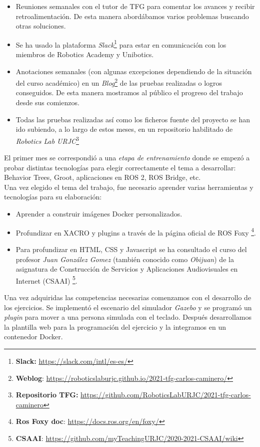 \begin{itemize}
	\item Reuniones semanales con el tutor de TFG para comentar los avances y recibir retroalimentación. De esta manera abordábamos varios problemas buscando otras soluciones.
	\item Se ha usado la plataforma \textit{Slack}\footnote{\textbf{Slack:} \url{https://slack.com/intl/es-es/}} para estar en comunicación con los miembros de Robotics Academy y Unibotics.
	\item Anotaciones semanales (con algunas excepciones dependiendo de la situación del curso académico) en un \textit{Blog}\footnote{\textbf{Weblog}: \url{https://roboticslaburjc.github.io/2021-tfg-carlos-caminero/}} de las pruebas realizadas o logros conseguidos. De esta manera mostramos al público el progreso del trabajo desde sus comienzos.
	\item Todas las pruebas realizadas así como los ficheros fuente del proyecto se han ido subiendo, a lo largo de estos meses, en un repositorio habilitado de \textit{Robotics Lab URJC}\footnote{\textbf{Repositorio TFG:} \url{https://github.com/RoboticsLabURJC/2021-tfg-carlos-caminero}}
\end{itemize}

El primer mes se correspondió a una \textit{etapa de entrenamiento} donde se empezó a probar distintas tecnologías para elegir correctamente el tema a desarrollar: Behavior Trees, Groot, aplicaciones en ROS 2, ROS Bridge, etc.\\

Una vez elegido el tema del trabajo, fue necesario aprender varias herramientas y tecnologías para su elaboración:
\begin{itemize}
	\item Aprender a construir imágenes Docker personalizados.
	\item Profundizar en XACRO y plugins a través de la página oficial de ROS Foxy \footnote{\textbf{Ros Foxy doc}: \url{https://docs.ros.org/en/foxy/}}.
	\item Para profundizar en HTML, CSS y Javascript se ha consultado el curso del profesor \textit{Juan González Gomez} (también conocido como \textit{Obijuan}) de la asignatura de Construcción de Servicios y Aplicaciones Audiovisuales en Internet (CSAAI) \footnote{\textbf{CSAAI}: \url{https://github.com/myTeachingURJC/2020-2021-CSAAI/wiki}}.
\end{itemize}

Una vez adquiridas las competencias necesarias comenzamos con el desarrollo de los ejercicios. Se implementó el escenario del simulador \textit{Gazebo} y se programó un \textit{plugin} para mover a una persona simulada con el teclado. Después desarrollamos la plantilla web para la programación del ejercicio y la integramos en un contenedor Docker.\\


